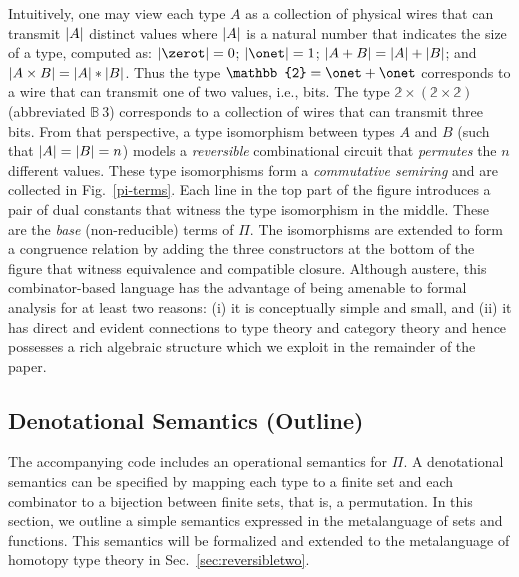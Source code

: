 \noindent Intuitively, one may view each type $A$ as a collection of physical wires that can transmit $| A |$
distinct values where $| A |$ is a natural number that indicates the size of a type, computed as:
$\sizet{\zerot} = 0$; $\sizet{\onet} = 1$; $| A + B | = | A | + | B |$; and
$| A \times B | = | A | * | B |$.  Thus the type $\mathbb{2} = \onet + \onet$ corresponds to a wire that can
transmit one of two values, i.e., bits. The type $\mathbb{2} \times (\mathbb{2} \times \mathbb{2})$ (abbreviated
$\mathbb{B}~3$) corresponds to a collection of wires that can transmit three bits. From that perspective, a type
isomorphism between types $A$ and $B$ (such that $| A |=| B |=n$) models a \emph{reversible} combinational
circuit that \emph{permutes} the $n$ different values. These type isomorphisms form a \emph{commutative semiring} and
are collected in Fig.~\ref{pi-terms}. Each line in the top part of the figure introduces a pair of dual constants that
witness the type isomorphism in the middle.  These are the \emph{base} (non-reducible) terms of $\Pi$. The isomorphisms
are extended to form a congruence relation by adding the three constructors at the bottom of the figure that witness
equivalence and compatible closure. Although austere, this combinator-based language has the advantage of being amenable
to formal analysis for at least two reasons: (i) it is conceptually simple and small, and (ii) it has direct and evident
connections to type theory and category theory and hence possesses a rich algebraic structure which we exploit in the
remainder of the paper.

\subsection{Denotational Semantics (Outline)}

\noindent The accompanying code includes an operational semantics for $\Pi$. A denotational semantics can be
specified by mapping each type to a finite set and each combinator to a bijection between finite sets, that is, a
permutation. In this section, we outline a simple semantics expressed in the metalanguage of sets and functions. This
semantics will be formalized and extended to the metalanguage of homotopy type theory in Sec.~\ref{sec:reversibletwo}.


